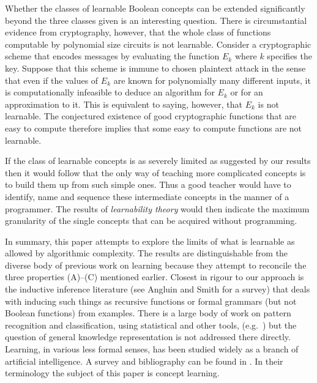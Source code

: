 Whether the classes of learnable Boolean concepts can be extended significantly beyond the
three classes given is an interesting question.
There is circumstantial evidence from cryptography,
however, that the whole class of functions computable by polynomial size circuits is not
learnable.  Consider a cryptographic scheme that
encodes messages by evaluating the function $E_k$
where $k$ specifies the key.  Suppose that this
scheme is immune to chosen plaintext attack in the
sense that even if the values of $E_k$ are known for
polynomially many different inputs, it is computationally infeasible to deduce an algorithm for $E_k$
or for an approximation to it.  This is equivalent
to saying, however, that $E_k$ is not learnable.
The conjectured existence of good cryptographic
functions that are easy to compute therefore implies that some easy to compute functions are not
learnable.

If the class of learnable concepts is as
severely limited as suggested by our results then
it would follow that the only way of teaching more
complicated concepts is to build them up from such
simple ones.  Thus a good teacher would have to
identify, name and sequence these intermediate
concepts in the manner of a programmer.  The results of \emph{learnability theory} would then indicate
the maximum granularity of the single concepts that
can be acquired without programming.

In summary, this paper attempts to explore the
limits of what is learnable as allowed by algorithmic complexity.  The results are distinguishable
from the diverse body of previous work on learning
because they attempt to reconcile the three properties (A)--(C) mentioned earlier.  Closest in
rigour to our approach is the inductive inference
literature (see Angluin and Smith \cite{1} for a survey)
that deals with inducing such things as recursive
functions or formal grammars (but not Boolean
functions) from examples.  There is a large body
of work on pattern recognition and classification,
using statistical and other tools, (e.g.\ \cite{4}) but
the question of general knowledge representation is
not addressed there directly.  Learning, in various
less formal senses, has been studied widely as a
branch of artificial intelligence.  A survey and
bibliography can be found in \cite{2,6}.  In their
terminology the subject of this paper is concept
learning.
